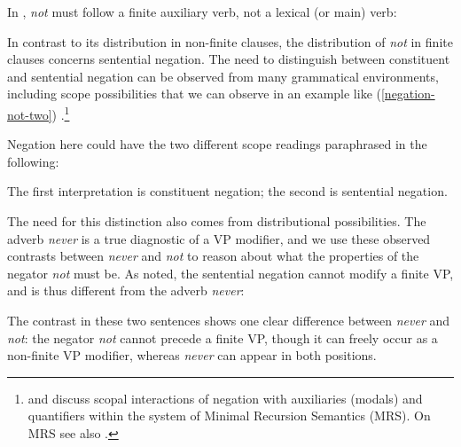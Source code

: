 \documentclass[output=paper
 	        ,biblatex
                ,babelshorthands
                ,newtxmath
                ,draftmode
                ,colorlinks, citecolor=brown
]{langscibook}
\begin{document}
\begin{exe}
\begin{xlist}
\begin{exe}
\begin{xlist}
\eal
{}
\zl
\noindent
In , \textit{not} must follow a finite
auxiliary verb, not a lexical (or main) verb:

\eal
{}
\zl

In contrast to its distribution
in non-finite clauses, the distribution
of \textit{not}
 in finite clauses concerns sentential
 negation.
  The need to distinguish between constituent and sentential negation can be
  observed from
  many grammatical environments, including scope
possibilities that we can observe in an example like (\ref{negation-not-two}) \parencites(see)(){Klima:64}{Baker:91}{Warner2000a-u}[]{kimmichaelis:2020}.\footnote{\citet{Warner2000a-u} and \citet{BL:13}
discuss scopal interactions of negation with auxiliaries (modals) and quantifiers
within the system of Minimal Recursion Semantics (MRS). On MRS see also .}

\z
%
Negation here could have the two different scope readings
paraphrased in the following:


\eal
{}
\zl
%
The first interpretation is constituent negation; the second is
sentential negation.


The need for this distinction also comes from
distributional possibilities.
The adverb \textit{never} is a true
diagnostic of a VP modifier, and we use
these observed contrasts
between \textit{never} and \textit{not} to reason about what the properties of the negator \textit{not} must be. As noted, the sentential
negation  cannot modify a finite
VP, and is thus different from the adverb \textit{never}:

\eal
{}
\zl
%
The contrast in these two sentences
shows one clear difference between \textit{never}
and \textit{not}: the negator \textit{not} cannot
precede a finite VP, though it can freely occur
as a non-finite VP modifier, whereas \textit{never} can appear in both positions.


\end{xlist}
\end{exe}
\end{xlist}
\end{exe}
\end{document}
